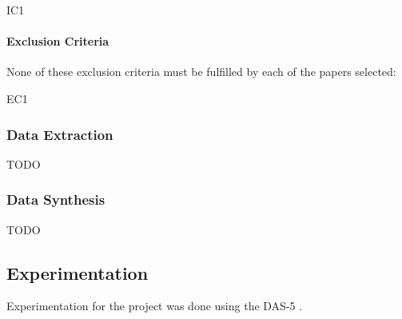 				\begin{aligneddescription}{IC1}
					\item[IC1] \icOne
					\item[IC2] \icTwo
					\item[IC3] \icThree
				\end{aligneddescription}
				
			\paragraph{Exclusion Criteria}
				None of these exclusion criteria must be fulfilled by each of the papers selected:
			
				\begin{aligneddescription}{EC1}
					\item[EC1] \ecOne
				\end{aligneddescription}
		
		\subsubsection{Data Extraction}
			TODO
		
		\subsubsection{Data Synthesis}
			TODO

	\subsection{Experimentation}
		Experimentation for the project was done using the DAS-5 \parencite{Bal2016}.